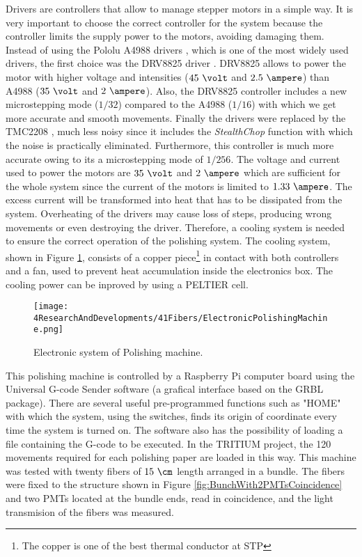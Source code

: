 \begin{enumerate}
Drivers are controllers that allow to manage stepper motors in a simple way. It is very important to choose the correct controller for the system because the controller limits the supply power to the motors, avoiding damaging them. Instead of using the Pololu A4988 drivers \cite{A4988Driver}, which is one of the most widely used drivers, the first choice was the DRV8825 driver \cite{DRV8825Driver}. DRV8825 allows to power the motor with higher voltage and intensities ($45~\volt$ and $2.5~\ampere$) than A4988 ($35~\volt$ and $2~\ampere$). Also, the DRV8825 controller includes a new microstepping mode ($1/32$) compared to the A4988 ($1/16$) with which we get more accurate and smooth movements. Finally the drivers were replaced by the TMC2208 \cite{TMC2208Driver}, much less noisy since it includes the \textit{StealthChop} function with which the noise is practically eliminated. Furthermore, this controller is much more accurate owing to its a microstepping mode of $1/256$. The voltage and current used to power the motors are $35~\volt$ and $2~\ampere$ which are sufficient for the whole system since the current of the motors is limited to $1.33~\ampere$. The excess current will be transformed into heat that has to be dissipated from the system. Overheating of the drivers may cause loss of steps, producing wrong movements or even destroying the driver. Therefore, a cooling system is needed to ensure the correct operation of the polishing system. The cooling system, shown in Figure \ref{fig:ElectronicSystemPolishingMachine}, consists of a copper piece\footnote{The copper is one of the best thermal conductor at STP} in contact with both controllers and a fan, used to prevent heat accumulation inside the electronics box. The cooling power can be inproved by using a PELTIER cell.

\begin{figure}[h]
\centering
\texttt{[image: 4ResearchAndDevelopments/41Fibers/ElectronicPolishingMachine.png]}
\caption{Electronic system of Polishing machine.\label{fig:ElectronicSystemPolishingMachine}}
\end{figure}

\end{enumerate}

This polishing machine is controlled by a Raspberry Pi computer board \cite{RaspberryPi} using the Universal G-code Sender software (a grafical interface based on the GRBL package). There are several useful pre-programmed functions such as "HOME" with which the system, using the switches, finds its origin of coordinate every time the system is turned on. The software also has the possibility of loading a file containing the G-code to be executed. In the TRITIUM project, the 120 movements required for each polishing paper are loaded in this way. This machine was tested with twenty fibers of $15~\cm$ length arranged in a bundle. The fibers were fixed to the structure shown in Figure \ref{fig:BunchWith2PMTsCoincidence} and two PMTs located at the bundle ends, read in coincidence, and the light transmision of the fibers was measured.

